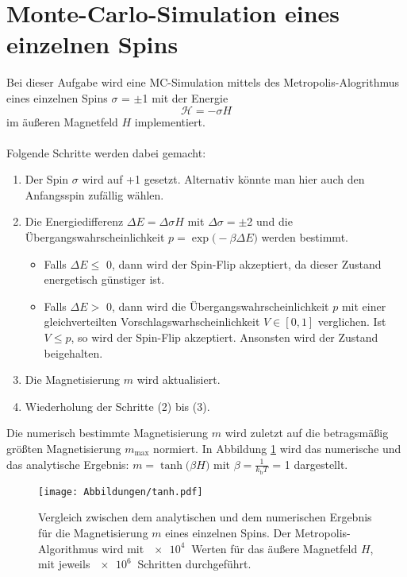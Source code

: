 



\maketitle

\section*{Monte-Carlo-Simulation eines einzelnen Spins}
Bei dieser Aufgabe wird eine MC-Simulation mittels des Metropolis-Alogrithmus
eines einzelnen Spins $\sigma$ = $\pm$1 mit der Energie
\begin{equation*}
  \mathcal{H}=-\sigma H
\end{equation*}
\noindent
im äußeren Magnetfeld $H$ implementiert.\\
\\
Folgende Schritte werden dabei gemacht:

\begin{enumerate}
  \item Der Spin $\sigma$ wird auf +1 gesetzt. Alternativ könnte man hier auch
  den Anfangsspin zufällig wählen.
  \item Die Energiedifferenz $\Delta E = \Delta\sigma H$ mit $\Delta\sigma = \pm$2
  und die Übergangswahrscheinlichkeit $p = \exp{\bigl(-\beta\Delta E\bigr)}$ werden bestimmt.
    \begin{itemize}
      \item Falls $\Delta E \leq$ 0, dann wird der Spin-Flip akzeptiert, da dieser
      Zustand energetisch günstiger ist.
      \item Falls $\Delta E >$ 0, dann wird die Übergangswahrscheinlichkeit $p$
      mit einer gleichverteilten Vorschlagswarhscheinlichkeit $V \in [0,1]$
      verglichen. Ist $V \leq p$, so wird der Spin-Flip akzeptiert. Ansonsten
      wird der Zustand beigehalten.
    \end{itemize}
  \item Die Magnetisierung $m$ wird aktualisiert.
  \item Wiederholung der Schritte (2) bis (3).
\end{enumerate}
\noindent
Die numerisch bestimmte Magnetisierung $m$ wird zuletzt auf die betragsmäßig
größten Magnetisierung $m_{\text{max}}$ normiert. In Abbildung \ref{fig:tanh}
wird das numerische und das analytische Ergebnis:
$m = \tanh{\bigl(\beta H \bigr)}$ mit
$\beta = \frac{1}{k_{\text{b}}T}$ = 1 dargestellt.

\begin{figure}[H]
    \centering
    \texttt{[image: Abbildungen/tanh.pdf]}
    \caption{Vergleich zwischen dem analytischen und dem numerischen Ergebnis für
    die Magnetisierung $m$ eines einzelnen Spins. Der Metropolis-Algorithmus
    wird mit $\SI{e4}{}$ Werten für das äußere Magnetfeld $H$, mit jeweils
    $\SI{e6}{}$ Schritten durchgeführt.}
    \label{fig:tanh}
\end{figure}



